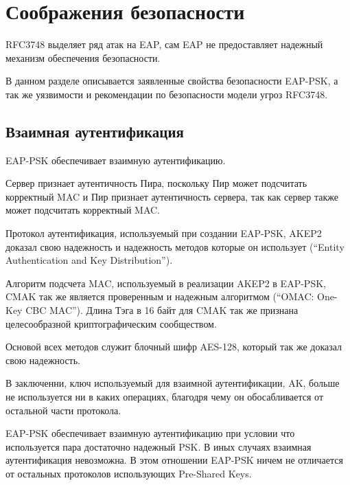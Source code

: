 \newpage
\section{Соображения безопасности}

RFC3748 выделяет ряд атак на EAP, сам EAP не предоставляет надежный механизм обеспечения безопасности.

В данном разделе описывается заявленные свойства безопасности EAP-PSK, а так же уязвимости и рекомендации по безопасности модели угроз RFC3748.

\subsection{Взаимная аутентификация}

EAP-PSK обеспечивает взаимную аутентификацию.

Сервер признает аутентичность Пира, поскольку Пир может подсчитать корректный MAC и Пир признает аутентичность сервера, так как сервер также может подсчитать корректный MAC.

Протокол аутентификация, используемый при создании EAP-PSK, AKEP2 доказал свою надежность и надежность методов которые он использует (``Entity Authentication and Key Distribution'').

Алгоритм подсчета MAC, используемый в реализации AKEP2 в EAP-PSK, CMAK так же является проверенным и надежным алгоритмом (``OMAC: One-Key CBC MAC''). Длина Тэга в 16 байт для CMAK так же признана целесообразной криптографическим сообществом.

Основой всех методов служит блочный шифр AES-128, который так же доказал свою надежность.

В заключенни, ключ используемый для взаимной аутентификации, AK, больше не используется ни в каких операциях, благодря чему он обосабливается от остальной части протокола.

EAP-PSK обеспечивает взаимную аутентификацию при условии что используется пара достаточно надежный PSK. В иных случаях взаимная аутентификация невозможна. В этом отношении EAP-PSK ничем не отличается от остальных протоколов использующих Pre-Shared Keys.
